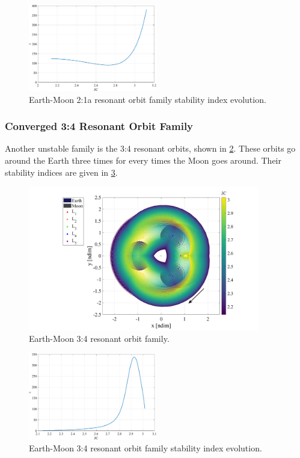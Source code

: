 \begin{figure}[ht]
    \centering
    \includegraphics[width=0.5\textwidth]{figures/Resonant2_1aStability.pdf}
    \caption{Earth-Moon 2:1a resonant orbit family stability index evolution.}
    \label{fig:2_1aResonantStability}
\end{figure}

\subsubsection{Converged 3:4 Resonant Orbit Family}
Another unstable family is the 3:4 resonant orbits, shown in \cref{fig:3_4Resonant}. These orbits
go around the Earth three times for every times the Moon goes around. Their stability indices are
given in \cref{fig:3_4ResonantStability}.

\begin{figure}[ht]
    \centering
    \includegraphics[width=0.9\textwidth]{figures/Resonant3_4Family.pdf}
    \caption{Earth-Moon 3:4 resonant orbit family.}
    \label{fig:3_4Resonant}
\end{figure}

\begin{figure}[ht]
    \centering
    \includegraphics[width=0.5\textwidth]{figures/Resonant3_4Stability.pdf}
    \caption{Earth-Moon 3:4 resonant orbit family stability index evolution.}
    \label{fig:3_4ResonantStability}
\end{figure}
